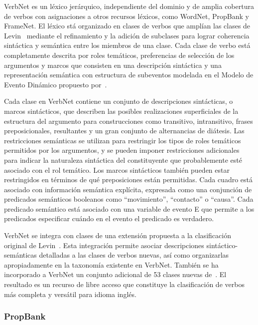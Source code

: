 VerbNet es un léxico jerárquico, independiente del dominio y de amplia cobertura de verbos con asignaciones a otros recursos léxicos, como WordNet, PropBank y FrameNet.
El léxico stá organizado en clases de verbos que amplían las clases de Levin~\cite{levin1993} mediante el refinamiento y la adición de subclases para lograr coherencia sintáctica y semántica entre los miembros de una clase.
Cada clase de verbo está completamente descrita por roles temáticos, preferencias de selección de los argumentos y marcos que consisten en una descripción sintáctica y una representación semántica con estructura de subeventos modelada en el Modelo de Evento Dinámico propuesto por~\citet{pustejovsky2013}.

Cada clase en VerbNet contiene un conjunto de descripciones sintácticas, o marcos sintácticos, que describen las posibles realizaciones superficiales de la estructura del argumento para construcciones como transitivo, intransitivo, frases preposicionales, resultantes y un gran conjunto de alternancias de diátesis.
Las restricciones semánticas se utilizan para restringir los tipos de roles temáticos permitidos por los argumentos, y se pueden imponer restricciones adicionales para indicar la naturaleza sintáctica del constituyente que probablemente esté asociado con el rol temático.
Los marcos sintácticos también pueden estar restringidos en términos de qué preposiciones están permitidas.
Cada cuadro está asociado con información semántica explícita, expresada como una conjunción de predicados semánticos booleanos como ``movimiento'', ``contacto'' o ``causa''.
Cada predicado semántico está asociado con una variable de evento E que permite a los predicados especificar cuándo en el evento el predicado es verdadero.

VerbNet se integra con clases de una extensión propuesta a la clasificación original de Levin~\cite{Kipper2006}.
Esta integración permite asociar descripciones sintáctico-semánticas detalladas a las clases de verbos nuevas, así como organizarlas apropiadamente en la taxonomía existente en VerbNet.
También se ha incorporado a VerbNet un conjunto adicional de 53 clases nuevas de~\citet{Korhonen2005}.
El resultado es un recurso de libre acceso que constituye la clasificación de verbos más completa y versátil para idioma inglés.

\subsubsection*{PropBank}


